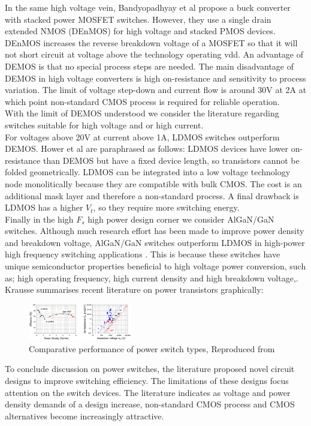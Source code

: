 \documentclass[letterpaper,twocolumn,10pt]{article}
\begin{document}
\indent In the same high voltage vein, Bandyopadhyay et al\cite{Bandyopadhyay2011} propose a buck converter with stacked power MOSFET switches. However, they use a single drain extended NMOS (DEnMOS) for high voltage and stacked PMOS devices. DEnMOS increases the reverse breakdown voltage of a MOSFET so that it will not short circuit at voltage above the technology operating vdd. An advantage of DEMOS is that no special process steps are needed. The main disadvantage of DEMOS in high voltage converters is high on-resistance and sensitivity to process variation. The limit of voltage step-down and current flow is around 30V at 2A \cite{Hower2005} at which point non-standard CMOS process is required for reliable operation.\\
\indent With the limit of DEMOS understood we consider the literature regarding switches suitable for high voltage and or high current.\\
For voltages above 20V at current above 1A, LDMOS switches outperform DEMOS. Hower et al\cite{Hower2005} are paraphrased as follows: LDMOS devices have lower on-resistance than DEMOS but have a fixed device length, so transistors cannot be folded geometrically. LDMOS can be integrated into a low voltage technology node monolitically because they are compatible with bulk CMOS. The cost is an additional mask layer and therefore a non-standard process. A final drawback is LDMOS has a higher $V_t$, so they require more switching energy.\\
\indent Finally in the high $F_s$ high power design corner we consider AlGaN/GaN switches. Although much research effort has been made to improve power density and breakdown voltage, AlGaN/GaN switches outperform LDMOS in high-power high frequency switching applications \cite{Goyal2013}. This is because these switches have unique semiconductor properties beneficial to high voltage power conversion, such as; high operating frequency, high current density and high breakdown voltage\cite{Alamo2009},\cite{Mustapha2008}. Krausse\cite{Krausse2013} summarises recent literature on power transistors graphically:\\ %
\begin{figure}[here]
\includegraphics[width=0.4\textwidth]{TransistorPerf}
\caption{Comparative performance of power switch types, Reproduced from\cite{Krausse2013}}
\label{GaNCharacter}
\end{figure}
\indent To conclude discussion on power switches, the literature proposed novel circuit designs to improve switching efficiency. The limitations of these designs focus attention on the switch devices. The literature indicates as voltage and power density demands of a design increase, non-standard CMOS process and CMOS alternatives become increasingly attractive.\\
\end{document}
